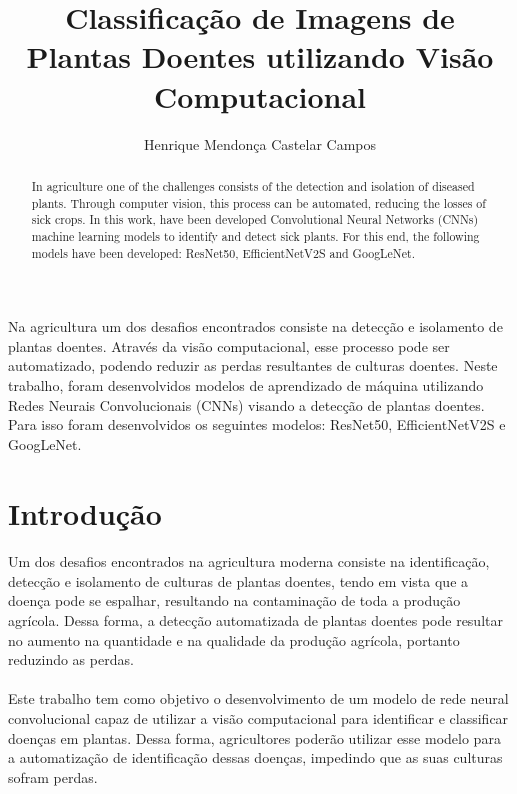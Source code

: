 \documentclass[12pt]{article}
\title{Classificação de Imagens de Plantas Doentes utilizando Visão Computacional}
\author{Henrique Mendonça Castelar Campos\inst{1}}
\begin{document}
 

\maketitle

\begin{abstract}

In agriculture one of the challenges consists of the detection and isolation of diseased plants. Through computer vision, this process can be automated, reducing the losses of sick crops. In this work, have been developed Convolutional Neural Networks (CNNs) machine learning models to identify and detect sick plants. For this end, the following models have been developed: ResNet50, EfficientNetV2S and GoogLeNet.
  
\end{abstract}
     
\begin{resumo} 

Na agricultura um dos desafios encontrados consiste na detecção e isolamento de plantas doentes. Através da visão computacional, esse processo pode ser automatizado, podendo reduzir as perdas resultantes de culturas doentes. Neste trabalho, foram desenvolvidos modelos de aprendizado de máquina utilizando Redes Neurais Convolucionais (CNNs) visando a detecção de plantas doentes. Para isso foram desenvolvidos os seguintes modelos: ResNet50, EfficientNetV2S e GoogLeNet.
  
\end{resumo}

\section{Introdução}

\paragraph{}Um dos desafios encontrados na agricultura moderna consiste na identificação, detecção e isolamento de culturas de plantas doentes, tendo em vista que a doença pode se espalhar, resultando na contaminação de toda a produção agrícola. Dessa forma, a detecção automatizada de plantas doentes pode resultar no aumento na quantidade e na qualidade da produção agrícola, portanto reduzindo as perdas.

\paragraph{}Este trabalho tem como objetivo o desenvolvimento de um modelo de rede neural convolucional capaz de utilizar a visão computacional para identificar e classificar doenças em plantas. Dessa forma, agricultores poderão utilizar esse modelo para a automatização de identificação dessas doenças, impedindo que as suas culturas sofram perdas.
\end{document}
